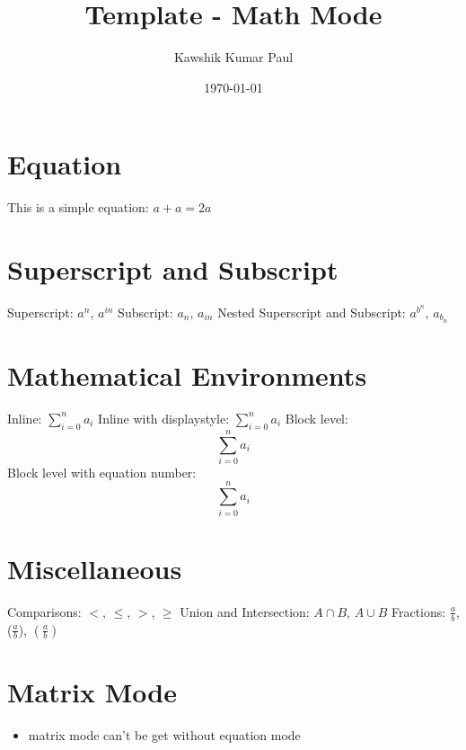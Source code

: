 \documentclass[16pt, a4paper]{article} %
\title{Template - Math Mode}
\author{Kawshik Kumar Paul}
\date{\today}
\begin{document}
\maketitle
\tableofcontents %
\pagebreak %

\section{Equation}
This is a simple equation: $a + a = 2a$

\section{Superscript and Subscript}
Superscript: $a^n$, $a^{in}$
\newline
Subscript: $a_n$, $a_{in}$
\newline
Nested Superscript and Subscript: $a^{b^n}$, $a_{b_n}$

\section{Mathematical Environments}
Inline: $\sum_{i=0}^n a_i$
\newline
Inline with displaystyle: $\displaystyle\sum_{i=0}^n a_i$
\newline
Block level: $$\sum_{i=0}^n a_i$$
\newline
Block level with equation number:
\begin{equation}
\sum_{i=0}^n a_i
\end{equation}

\section{Miscellaneous}
Comparisons:
$ <$, $ \leq $, $ > $, $\geq $
\newline
Union and Intersection:
$A \cap B$, $A \cup B$
\newline
Fractions: $\frac{a}{b}$, ($\frac{a}{b}$), $\left(\frac{a}{b}\right)$


\section{Matrix Mode}
    \begin{itemize}
    \item matrix mode can't be get without equation mode 
    \end{itemize}
\end{document}
